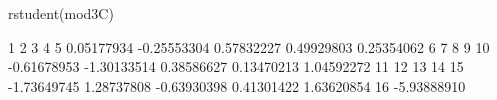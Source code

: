 \begin{Schunk}
\begin{Sinput}
 rstudent(mod3C)
\end{Sinput}
\begin{Soutput}
          1           2           3           4           5 
 0.05177934 -0.25553304  0.57832227  0.49929803  0.25354062 
          6           7           8           9          10 
-0.61678953 -1.30133514  0.38586627  0.13470213  1.04592272 
         11          12          13          14          15 
-1.73649745  1.28737808 -0.63930398  0.41301422  1.63620854 
         16 
-5.93888910 
\end{Soutput}
\end{Schunk}

